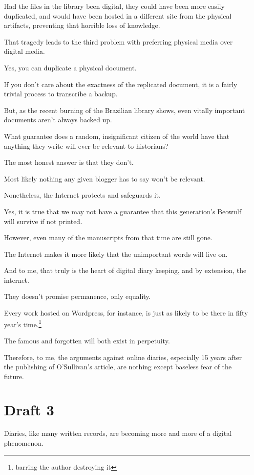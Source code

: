 \documentclass[12pt]{article}[titlepage]
\newcommand{\1}{\={a}}
\newcommand{\2}{\={e}}
\newcommand{\3}{\={\i}}
\newcommand{\4}{\=o}
\newcommand{\5}{\=u}
\newcommand{\6}{\={A}}
\renewcommand{\,}{\textsuperscript{,}}
\begin{document}
Had the files in the library been digital, they could have been more easily duplicated, and would have been hosted in a different site from the physical artifacts, preventing that horrible loss of knowledge.


That tragedy leads to the third problem with preferring physical media over digital media.

Yes, you can duplicate a physical document.

If you don’t care about the exactness of the replicated document, it is a fairly trivial process to transcribe a backup.

But, as the recent burning of the Brazilian library shows, even vitally important documents aren’t always backed up.

What guarantee does a random, insignificant citizen of the world have that anything they write will ever be relevant to historians?


The most honest answer is that they don’t.

Most likely nothing any given blogger has to say won’t be relevant.

Nonetheless, the Internet protects and safeguards it.

Yes, it is true that we may not have a guarantee that this generation’s Beowulf will survive if not printed.

However, even many of the manuscripts from that time are still gone.

The Internet makes it more likely that the unimportant words will live on.


And to me, that truly is the heart of digital diary keeping, and by extension, the internet.

They doesn’t promise permanence, only equality.

Every work hosted on Wordpress, for instance, is just as likely to be there in fifty year’s time.\footnote{barring the author destroying it}

The famous and forgotten will both exist in perpetuity.

Therefore, to me, the arguments against online diaries, especially 15 years after the publishing of O’Sullivan’s article, are nothing except baseless fear of the future.


\section{Draft 3}

Diaries, like many written records, are becoming more and more of a digital phenomenon.
\end{document}
